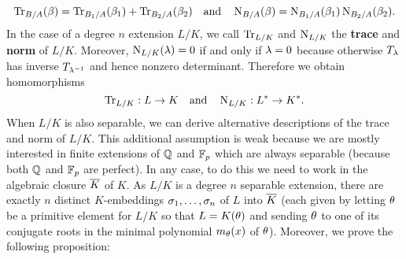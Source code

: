     \begin{equation}\label{equ:trace_and_norm_direct_sums}
      \operatorname{\mathrm{Tr}}_{B/A}(\beta) = \operatorname{\mathrm{Tr}}_{B_{1}/A}(\beta_{1})+\operatorname{\mathrm{Tr}}_{B_{2}/A}(\beta_{2}) \quad \text{and} \quad \operatorname{\mathrm{N}}_{B/A}(\beta) = \operatorname{\mathrm{N}}_{B_{1}/A}(\beta_{1})\operatorname{\mathrm{N}}_{B_{2}/A}(\beta_{2}).
    \end{equation}
    In the case of a degree $n$ extension $L/K$, we call $\operatorname{\mathrm{Tr}}_{L/K}$ and $\operatorname{\mathrm{N}}_{L/K}$ the \textbf{trace} and \textbf{norm} of $L/K$. Moreover, $\operatorname{\mathrm{N}}_{L/K}(\lambda) = 0$ if and only if $\lambda = 0$ because otherwise $T_{\lambda}$ has inverse $T_{\lambda^{-1}}$ and hence nonzero determinant. Therefore we obtain homomorphisms
    \[
      \operatorname{\mathrm{Tr}}_{L/K}:L \to K \quad \text{and} \quad \operatorname{\mathrm{N}}_{L/K}:L^{\ast} \to K^{\ast}.
    \]
    When $L/K$ is also separable, we can derive alternative descriptions of the trace and norm of $L/K$. This additional assumption is weak because we are mostly interested in finite extensions of $\mathbb{Q}$ and $\mathbb{F}_{p}$ which are always separable (because both $\mathbb{Q}$ and $\mathbb{F}_{p}$ are perfect). In any case, to do this we need to work in the algebraic closure $\overline{K}$ of $K$. As $L/K$ is a degree $n$ separable extension, there are exactly $n$ distinct $K$-embeddings $\sigma_{1},\ldots,\sigma_{n}$ of $L$ into $\overline{K}$ (each given by letting $\theta$ be a primitive element for $L/K$ so that $L = K(\theta)$ and sending $\theta$ to one of its conjugate roots in the minimal polynomial $m_{\theta}(x)$ of $\theta$). Moreover, we prove the following proposition:

